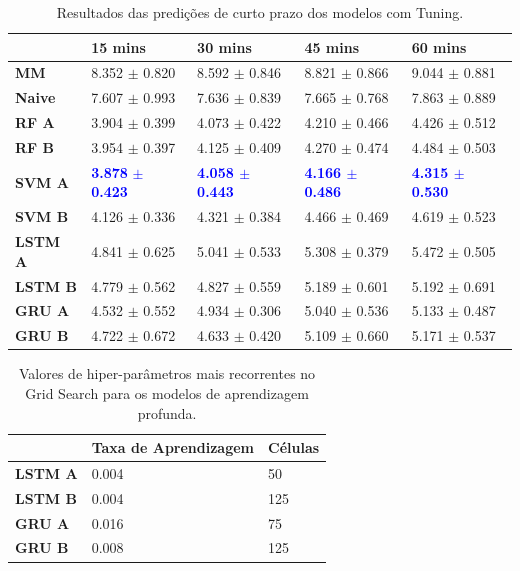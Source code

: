 \begin{table}[H]
    \begin{tabular*}{\linewidth}{@{\extracolsep{\fill}}lllll}
    \toprule
     & 
    \multicolumn{1}{l}{\textbf{15 mins}} & 
    \multicolumn{1}{l}{\textbf{30 mins}} &
    \multicolumn{1}{l}{\textbf{45 mins}} &
    \multicolumn{1}{l}{\textbf{60 mins}} \\
\midrule
\textbf{MM} & 8.352 $\pm$ 0.820 & 8.592 $\pm$ 0.846 & 8.821 $\pm$ 0.866 & 9.044 $\pm$ 0.881
\\
\midrule
\textbf{Naive} & 7.607 $\pm$ 0.993 & 7.636 $\pm$ 0.839 & 7.665 $\pm$ 0.768 & 7.863 $\pm$ 0.889
\\
\midrule
\textbf{RF A} & 3.904 $\pm$ 0.399 & 4.073 $\pm$ 0.422 & 4.210 $\pm$ 0.466 & 4.426 $\pm$ 0.512
\\
\midrule
\textbf{RF B} & 3.954 $\pm$ 0.397 & 4.125 $\pm$ 0.409 & 4.270 $\pm$ 0.474 & 4.484 $\pm$ 0.503
\\
\midrule
\textbf{SVM A} &  \textcolor{blue}{\textbf{3.878} $\pm$}  \textcolor{blue}{\textbf{0.423}} & \textcolor{blue}{\textbf{4.058 $\pm$ 0.443}} & \textcolor{blue}{\textbf{4.166 $\pm$ 0.486}} & \textcolor{blue}{\textbf{4.315 $\pm$ 0.530}}
\\
\midrule
\textbf{SVM B} & 4.126 $\pm$ 0.336 & 4.321 $\pm$ 0.384 & 4.466 $\pm$ 0.469 & 4.619 $\pm$ 0.523
\\
\midrule
\textbf{LSTM A} & 4.841 $\pm$ 0.625 & 5.041 $\pm$ 0.533 & 5.308 $\pm$ 0.379 & 5.472 $\pm$ 0.505
\\
\midrule
\textbf{LSTM B} & 4.779 $\pm$ 0.562 & 4.827 $\pm$ 0.559 & 5.189 $\pm$ 0.601 & 5.192 $\pm$ 0.691
\\
\midrule
\textbf{GRU A} & 4.532 $\pm$ 0.552 & 4.934 $\pm$ 0.306 & 5.040 $\pm$ 0.536 & 5.133 $\pm$ 0.487
\\
\midrule
\textbf{GRU B} & 4.722 $\pm$ 0.672 & 4.633 $\pm$ 0.420 & 5.109 $\pm$ 0.660 & 5.171 $\pm$ 0.537
\\
    \bottomrule
    \end{tabular*}
    \label{table:curto_prazo_tuning}
    \caption{Resultados das predições de curto prazo dos modelos com Tuning.}
\end{table}

\begin{table}[H]
    \begin{tabular*}{\linewidth}{@{\extracolsep{\fill}}lll}
    \toprule
     & 
    \multicolumn{1}{l}{\textbf{Taxa de Aprendizagem}} & 
    \multicolumn{1}{l}{\textbf{Células}} 
    \\
\midrule
\textbf{LSTM A} & 0.004 & 50\\ \midrule
\textbf{LSTM B} & 0.004 & 125 \\ \midrule
\textbf{GRU A} & 0.016 &  75 \\ \midrule
\textbf{GRU B} & 0.008 &  125 \\
    \bottomrule
    \end{tabular*}
    \label{table:best_hiper_deep}
    \caption{Valores de hiper-parâmetros mais recorrentes no Grid Search para os modelos de aprendizagem profunda.}
\end{table}


